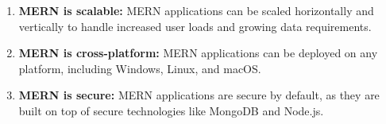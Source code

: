 \documentclass[11pt]{article}
\begin{document}
\begin{enumerate}
\begin{enumerate}
              \item \textbf{MERN is scalable:} MERN applications can be scaled horizontally and vertically to handle increased user loads and growing data requirements.
              \item \textbf{MERN is cross-platform:} MERN applications can be deployed on any platform, including Windows, Linux, and macOS.
              \item \textbf{MERN is secure:} MERN applications are secure by default, as they are built on top of secure technologies like MongoDB and Node.js.
          \end{enumerate}


\end{enumerate}
\end{document}
